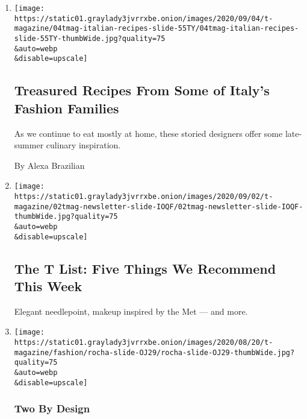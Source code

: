 \begin{enumerate}
\def\labelenumi{\arabic{enumi}.}
\item
  \href{/2020/09/04/t-magazine/fashion-italian-recipes.html}{}

  \texttt{[image: https://static01.graylady3jvrrxbe.onion/images/2020/09/04/t-magazine/04tmag-italian-recipes-slide-55TY/04tmag-italian-recipes-slide-55TY-thumbWide.jpg?quality=75\\\&auto=webp\\\&disable=upscale]}

  \hypertarget{treasured-recipes-from-some-of-italys-fashion-families}{%
  \subsection{Treasured Recipes From Some of Italy's Fashion
  Families}\label{treasured-recipes-from-some-of-italys-fashion-families}}

  As we continue to eat mostly at home, these storied designers offer
  some late-summer culinary inspiration.

  By Alexa Brazilian
\item
  \href{/2020/09/03/t-magazine/ollies-pizza-estee-lauder-met.html}{}

  \texttt{[image: https://static01.graylady3jvrrxbe.onion/images/2020/09/02/t-magazine/02tmag-newsletter-slide-IOQF/02tmag-newsletter-slide-IOQF-thumbWide.jpg?quality=75\\\&auto=webp\\\&disable=upscale]}

  \hypertarget{the-t-list-five-things-we-recommend-this-week}{%
  \subsection{The T List: Five Things We Recommend This
  Week}\label{the-t-list-five-things-we-recommend-this-week}}

  Elegant needlepoint, makeup inspired by the Met --- and more.
\item
  \href{/2020/09/01/t-magazine/simone-max-rocha-family.html}{}

  \texttt{[image: https://static01.graylady3jvrrxbe.onion/images/2020/08/20/t-magazine/fashion/rocha-slide-OJ29/rocha-slide-OJ29-thumbWide.jpg?quality=75\\\&auto=webp\\\&disable=upscale]}

  \hypertarget{two-by-design}{%
  \subsubsection{Two By Design}\label{two-by-design}}

  \hypertarget{for-simone-and-max-rocha-family-has-always-been-a-source-of-inspiration}{%
}
\end{enumerate}

